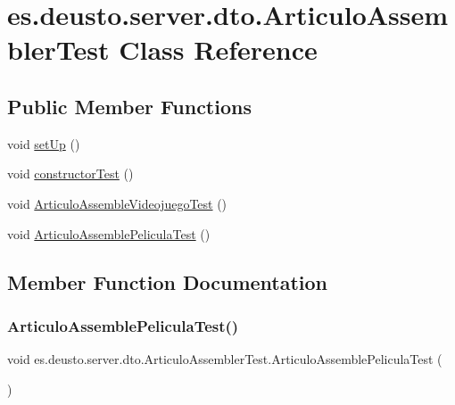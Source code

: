 \hypertarget{classes_1_1deusto_1_1server_1_1dto_1_1_articulo_assembler_test}{}\section{es.\+deusto.\+server.\+dto.\+Articulo\+Assembler\+Test Class Reference}
\label{classes_1_1deusto_1_1server_1_1dto_1_1_articulo_assembler_test}
\subsection*{Public Member Functions}
\begin{DoxyCompactItemize}
\item 
void \mbox{\hyperlink{classes_1_1deusto_1_1server_1_1dto_1_1_articulo_assembler_test_ae103fec7c047a684bb1bc46af02f3adb}{set\+Up}} ()
\item 
void \mbox{\hyperlink{classes_1_1deusto_1_1server_1_1dto_1_1_articulo_assembler_test_a5a69d3d925547a1a515b89dfc926c40d}{constructor\+Test}} ()
\item 
void \mbox{\hyperlink{classes_1_1deusto_1_1server_1_1dto_1_1_articulo_assembler_test_a6e2f09e134a6641c6eb2f44b867eba7f}{Articulo\+Assemble\+Videojuego\+Test}} ()
\item 
void \mbox{\hyperlink{classes_1_1deusto_1_1server_1_1dto_1_1_articulo_assembler_test_a486c32f903794380fe5dca38911a3df2}{Articulo\+Assemble\+Pelicula\+Test}} ()
\end{DoxyCompactItemize}


\subsection{Member Function Documentation}
\mbox{\label{classes_1_1deusto_1_1server_1_1dto_1_1_articulo_assembler_test_a486c32f903794380fe5dca38911a3df2}} 
\subsubsection{\texorpdfstring{ArticuloAssemblePeliculaTest()}{ArticuloAssemblePeliculaTest()}}
{\footnotesize\ttfamily void es.\+deusto.\+server.\+dto.\+Articulo\+Assembler\+Test.\+Articulo\+Assemble\+Pelicula\+Test (\begin{DoxyParamCaption}{ }\end{DoxyParamCaption})}

